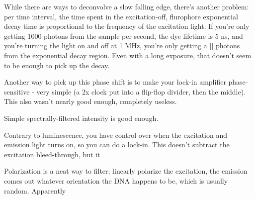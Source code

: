 \documentclass[paper.tex]{subfiles}
\begin{document}
While there are ways to deconvolve a slow falling edge, there’s another problem: per time interval, the time spent in the excitation-off, flurophore exponential decay time is proportional to the frequency of the excitation light. If you’re only getting 1000 photons from the sample per second, the dye lifetime is 5 ns, and you’re turning the light on and off at 1 MHz, you’re only getting a [] photons from the exponential decay region. Even with a long exposure, that doesn’t seem to be enough to pick up the decay. 

Another way to pick up this phase shift is to make your lock-in amplifier phase-sensitive - very simple (a 2x clock put into a flip-flop divider, then the middle). This also wasn’t nearly good enough, completely useless. 

Simple spectrally-filtered intensity is good enough.

Contrary to luminescence, you have control over when the excitation and emission light turns on, so you can do a lock-in. This doesn’t subtract the excitation bleed-through, but it 

Polarization is a neat way to filter; linearly polarize the excitation, the emission comes out whatever orientation the DNA happens to be, which is usually random. Apparently
\end{document}
